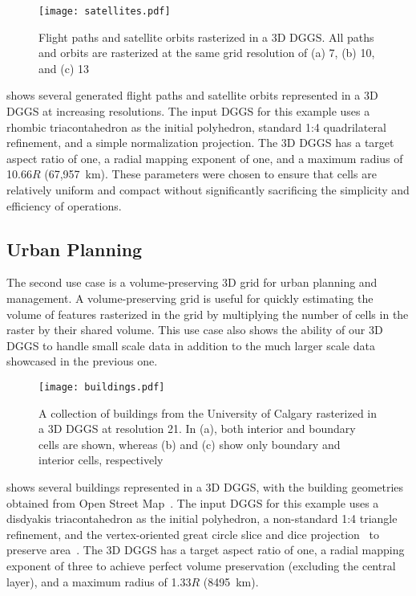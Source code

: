 \begin{figure}[ht!]
	\centering
	\texttt{[image: satellites.pdf]}
	\caption[Flight path and satellite orbit use case showing several sample trajectories]{
		Flight paths and satellite orbits rasterized in a 3D DGGS.
		All paths and orbits are rasterized at the same grid resolution of (a) 7, (b) 10, and (c) 13
	}
	\label{fig:satellites}
\end{figure}


 shows several generated flight paths and satellite orbits represented in a 3D DGGS at increasing resolutions.
The input DGGS for this example uses a rhombic triacontahedron as the initial polyhedron, standard 1:4 quadrilateral refinement, and a simple normalization projection.
The 3D DGGS has a target aspect ratio of one, a radial mapping exponent of one, and a maximum radius of 10.66$R$ (67,957~km).
These parameters were chosen to ensure that cells are relatively uniform and compact without significantly sacrificing the simplicity and efficiency of operations.

\subsection{Urban Planning}
The second use case is a volume-preserving 3D grid for urban planning and management.
A volume-preserving grid is useful for quickly estimating the volume of features rasterized in the grid by multiplying the number of cells in the raster by their shared volume.
This use case also shows the ability of our 3D DGGS to handle small scale data in addition to the much larger scale data showcased in the previous one.


\begin{figure}[ht!]
	\centering
	\texttt{[image: buildings.pdf]}
	\caption[Urban planning use case showing various rasterized buildings]{
		A collection of buildings from the University of Calgary rasterized in a 3D DGGS at resolution 21.
		In (a), both interior and boundary cells are shown, whereas (b) and (c) show only boundary and interior cells, respectively
	}
	\label{fig:urbanplanning}
\end{figure}


 shows several buildings represented in a 3D DGGS, with the building geometries obtained from Open Street Map~\cite{osm}.
The input DGGS for this example uses a disdyakis triacontahedron as the initial polyhedron, a non-standard 1:4 triangle refinement, and the vertex-oriented great circle slice and dice projection~\cite{van2006slice} to preserve area~\cite{hall2020disdyakis}.
The 3D DGGS has a target aspect ratio of one, a radial mapping exponent of three to achieve perfect volume preservation (excluding the central layer), and a maximum radius of 1.33$R$ (8495~km).


